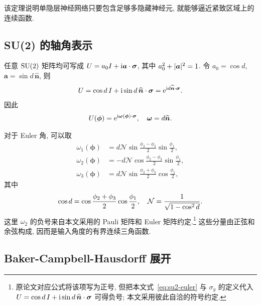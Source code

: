 \documentclass[a4paper]{ctexart}
\begin{document}
该定理说明单隐层神经网络只要包含足够多隐藏神经元, 就能够逼近紧致区域上的连续函数.

\subsection{SU(2) 的轴角表示}

任意 $\text{SU}(2)$ 矩阵均可写成 $U=a_0 I+\mathrm{i}\bm{a}\cdot\bm{\sigma}$, 其中 $a_0^2+\lvert\bm{a}\rvert^2=1$. 令 $a_0=\cos d$, $\bm{a}=\sin d\, \widehat{\bm{n}}$, 则
\begin{align}
    U=\cos d\, I+\mathrm{i}\sin d\, \widehat{\bm{n}}\cdot\bm{\sigma}=\mathrm{e}^{\mathrm{i} d\widehat{\bm{n}}\cdot\bm{\sigma}}.
\end{align}
因此
\begin{align}
    U(\bm{\phi})=\mathrm{e}^{\mathrm{i}\bm{\omega}(\bm{\phi})\cdot\bm{\sigma}}, \quad\bm{\omega}=d\widehat{\bm{n}}.
    \label{eq:axis-angle-su2}
\end{align}

对于 Euler 角, 可以取
\begin{align}
    \omega_1(\bm{\phi}) & =d\mathcal{N}\sin\frac{\phi_2-\phi_3}{2}\sin\frac{\phi_1}{2},  \\
    \omega_2(\bm{\phi}) & =-d\mathcal{N}\cos\frac{\phi_2-\phi_3}{2}\sin\frac{\phi_1}{2}, \\
    \omega_3(\bm{\phi}) & =d\mathcal{N}\sin\frac{\phi_2+\phi_3}{2}\cos\frac{\phi_1}{2},
\end{align}
其中
\begin{align}
    \cos d=\cos\frac{\phi_2+\phi_3}{2}\cos\frac{\phi_1}{2}, \quad \mathcal{N}=\frac{1}{\sqrt{1-\cos^2 d}}.
\end{align}
这里 $\omega_2$ 的负号来自本文采用的 Pauli 矩阵和 Euler 矩阵约定.\footnote{原论文对应公式将该项写为正号, 但把本文式~\eqref{eq:su2-euler} 与 $\sigma_y$ 的定义代入 $U=\cos d\,I+\mathrm{i}\sin d\,\widehat{\bm n}\cdot\bm\sigma$ 可得负号; 本文采用彼此自洽的符号约定.} 这些分量由正弦和余弦构成, 因而是输入角度的有界连续三角函数.

\subsection{Baker-Campbell-Hausdorff 展开}
\end{document}
